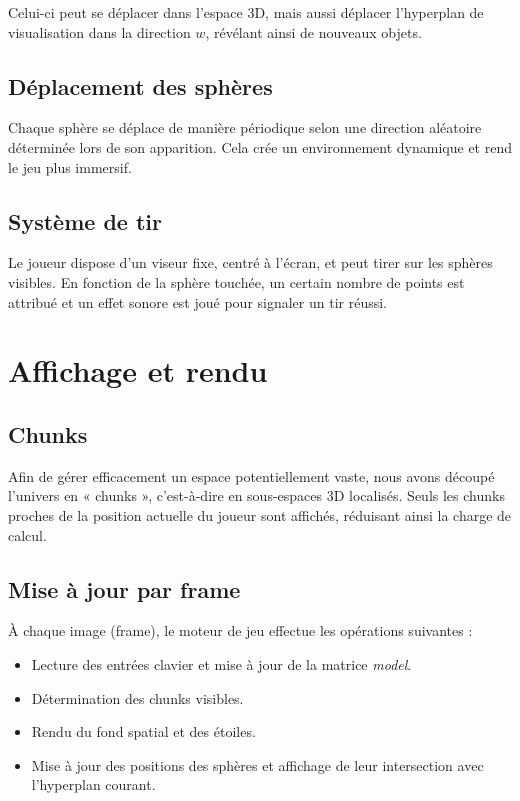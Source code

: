 \documentclass[11pt,a4paper]{article}
\begin{document}
Celui-ci peut se déplacer dans l’espace 3D, mais aussi déplacer l’hyperplan de visualisation dans la direction $w$, révélant ainsi de nouveaux objets.

\subsection{Déplacement des sphères}

Chaque sphère se déplace de manière périodique selon une direction aléatoire déterminée lors de son apparition. Cela crée un environnement dynamique et rend le jeu plus immersif.

\subsection{Système de tir}

Le joueur dispose d’un viseur fixe, centré à l’écran, et peut tirer sur les sphères visibles. En fonction de la sphère touchée, un certain nombre de points est attribué et un effet sonore est joué pour signaler un tir réussi.

\section{Affichage et rendu}

\subsection{Chunks}

Afin de gérer efficacement un espace potentiellement vaste, nous avons découpé l’univers en « chunks », c’est-à-dire en sous-espaces 3D localisés. Seuls les chunks proches de la position actuelle du joueur sont affichés, réduisant ainsi la charge de calcul.

\subsection{Mise à jour par frame}

À chaque image (frame), le moteur de jeu effectue les opérations suivantes :
\begin{itemize}
    \item Lecture des entrées clavier et mise à jour de la matrice \textit{model}.
    \item Détermination des chunks visibles.
    \item Rendu du fond spatial et des étoiles.
    \item Mise à jour des positions des sphères et affichage de leur intersection avec l’hyperplan courant.
\end{itemize}
\end{document}
